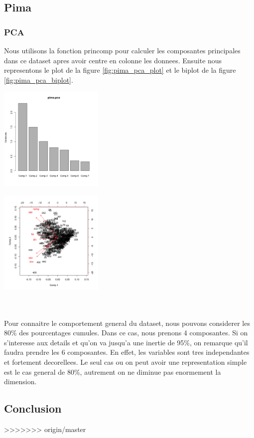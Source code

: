 \documentclass[10pt]{article}
\begin{document}
\subsection{Pima}
\subsubsection{PCA}

Nous utilisons la fonction princomp pour calculer les composantes principales dans ce dataset apres avoir centre en colonne les donnees. Ensuite nous representons le plot de la figure \ref{fig:pima_pca_plot} et le biplot de la figure \ref{fig:pima_pca_biplot}.
\\
	\begin{minipage}{.5\textwidth}
	\centering
	\includegraphics[width=50mm]{Figures/Pima/pca_plot.png}
	\label{fig:pima_pca_plot}
\end{minipage}%
\hspace{0.08\linewidth}
\begin{minipage}{.5\textwidth}
	\centering
	\includegraphics[width=50mm]{Figures/Pima/pca_biplot.png}
	\label{fig:pima_pca_biplot}
\end{minipage}
\\
\\
Pour connaitre le comportement general du dataset, nous pouvons considerer les 80\% des pourcentages cumules. Dans ce cas, nous prenons 4 composantes. Si on s'interesse aux details et qu'on va jusqu'a une inertie de 95\%, on remarque qu'il faudra prendre les 6 composantes. En effet, les variables sont tres independantes et fortement decorellees. Le seul cas ou on peut avoir une representation simple est le cas general de 80\%, autrement on ne diminue pas enormement la dimension. 
\subsection{Conclusion}
>>>>>>> origin/master
\end{document}
